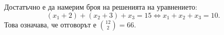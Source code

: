 \begin{solution}
\begin{enumerate}[a)]


    Достатъчно е да намерим броя на решенията на уравнението:
    \[(x_1 + 2) + (x_2 + 3) + x_3 = 15 \iff x_1 + x_2 + x_3 = 10.\]
    Това означава, че отговорът е $\binom{12}{2} = 66$.

\end{enumerate}
\end{solution}

